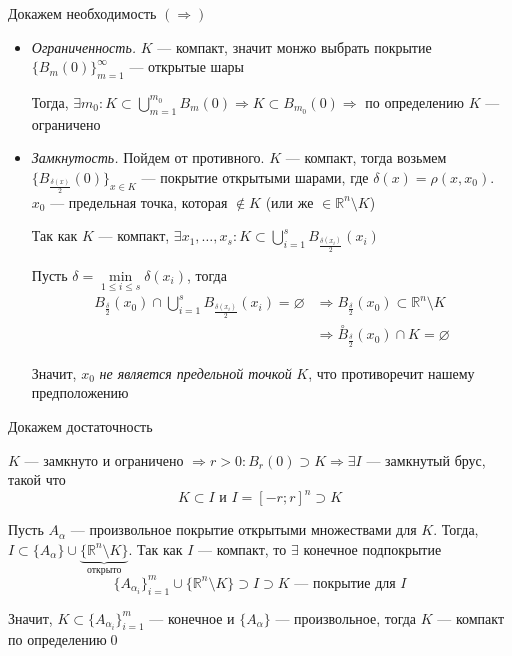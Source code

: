 \documentclass[a4paper]{article}
\begin{document}
\proof Докажем необходимость $(\Longrightarrow)$
\begin{itemize}
    \item \textit{Ограниченность.} $K$ — компакт, значит монжо выбрать покрытие $\{B_{m}(0)\}_{m=1}^{\infty}$ — открытые шары
    
    Тогда, $\exists m_0:K\subset \displaystyle\bigcup_{m=1}^{m_0} B_m(0)\Longrightarrow K\subset B_{m_0}(0)\Longrightarrow$ по определению $K$ — ограничено

    \item \textit{Замкнутость.} Пойдем от противного. $K$ — компакт, тогда возьмем $\{B_{\frac{\delta(x)}{2}}(0)\}_{x\in K}$ — покрытие открытыми шарами, где $\delta(x)=\rho(x,x_0)$. $x_0$ — предельная точка, которая $\notin K$ (или же $\in \mathbb{R}^n\setminus K$)
    
    Так как $K$ — компакт, $\exists x_1,\ldots, x_s:K\subset\displaystyle\bigcup_{i=1}^{s} B_{\frac{\delta(x_i)}{2}}(x_i)$

    Пусть $\delta=\min\limits_{1\leqslant i\leqslant s}{\delta(x_i)}$, тогда
    \begin{equation*}
        \begin{aligned}
            B_{\frac{\delta}{2}}(x_0)\cap\bigcup_{i=1}^{s}B_{\frac{\delta(x_i)}{2}}(x_i)=\varnothing&\Longrightarrow B_{\frac{\delta}{2}}(x_0)\subset\mathbb{R}^n\setminus K\\
            &\Longrightarrow\stackrel{\circ}{B}_{\frac{\delta}{2}}(x_0)\cap K=\varnothing
        \end{aligned}
    \end{equation*}

    Значит, $x_0$ \textit{не является предельной точкой} $K$, что противоречит нашему предположению
\end{itemize}

\proof Докажем достаточность

$K$ — замкнуто и ограничено $\Longrightarrow r>0:B_r(0)\supset K\Longrightarrow\exists I$ — замкнутый брус, такой что 
$$K\subset I\text{ и }I=[-r;r]^n\supset K$$

Пусть $A_{\alpha}$ — произвольное покрытие открытыми множествами для $K$. Тогда, $I\subset \{A_{\alpha}\}\cup\underbrace{\{\mathbb{R}^n\setminus K\}}_{\text{открыто}}$. Так как $I$ — компакт, то $\exists $ конечное подпокрытие 
$$\{A_{\alpha_i}\}_{i=1}^m\cup\{\mathbb{R}^n\setminus K\}\supset I\supset K\text{ — покрытие для $I$}$$

Значит, $K\subset\{A_{\alpha_i}\}_{i=1}^{m}$ — конечное и $\{A_{\alpha}\}$ — произвольное, тогда $K$ — компакт по определению\qed
\end{document}
